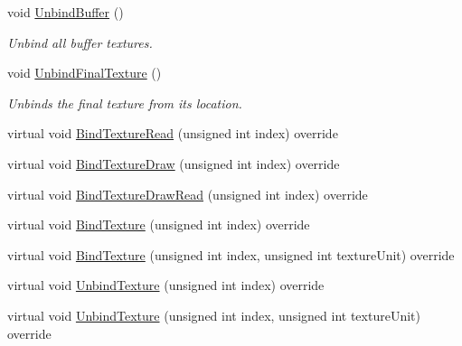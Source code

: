 \begin{DoxyCompactItemize}
\mbox{\label{class_geometry_engine_1_1_geometry_buffer_1_1_g_buffer_a2c24808c13f616bcc3ca6ed321277e95}} 
void \mbox{\hyperlink{class_geometry_engine_1_1_geometry_buffer_1_1_g_buffer_a2c24808c13f616bcc3ca6ed321277e95}{Unbind\+Buffer}} ()
\begin{DoxyCompactList}\small\item\em Unbind all buffer textures. \end{DoxyCompactList}\item 
\mbox{\label{class_geometry_engine_1_1_geometry_buffer_1_1_g_buffer_a954286e665d76dc77f352923a3c0b191}} 
void \mbox{\hyperlink{class_geometry_engine_1_1_geometry_buffer_1_1_g_buffer_a954286e665d76dc77f352923a3c0b191}{Unbind\+Final\+Texture}} ()
\begin{DoxyCompactList}\small\item\em Unbinds the final texture from its location. \end{DoxyCompactList}\item 
virtual void \mbox{\hyperlink{class_geometry_engine_1_1_geometry_buffer_1_1_g_buffer_a40c1b8f341429f061a381ba98574ea82}{Bind\+Texture\+Read}} (unsigned int index) override
\item 
virtual void \mbox{\hyperlink{class_geometry_engine_1_1_geometry_buffer_1_1_g_buffer_ab14f2b1778d7415674b67c3349392cc9}{Bind\+Texture\+Draw}} (unsigned int index) override
\item 
virtual void \mbox{\hyperlink{class_geometry_engine_1_1_geometry_buffer_1_1_g_buffer_a1df706f920cc9a2b15609c6c7e179130}{Bind\+Texture\+Draw\+Read}} (unsigned int index) override
\item 
virtual void \mbox{\hyperlink{class_geometry_engine_1_1_geometry_buffer_1_1_g_buffer_a2c9c631c31f0bda3c9f01c4402819e4b}{Bind\+Texture}} (unsigned int index) override
\item 
virtual void \mbox{\hyperlink{class_geometry_engine_1_1_geometry_buffer_1_1_g_buffer_a9a6d75cdb98cc00e34648f5f423382f1}{Bind\+Texture}} (unsigned int index, unsigned int texture\+Unit) override
\item 
virtual void \mbox{\hyperlink{class_geometry_engine_1_1_geometry_buffer_1_1_g_buffer_a3034ecd5b07b64a0cb7af24f5c6f80ae}{Unbind\+Texture}} (unsigned int index) override
\item 
virtual void \mbox{\hyperlink{class_geometry_engine_1_1_geometry_buffer_1_1_g_buffer_a1f02674c4ff24debb9f4b1b6d1243a9b}{Unbind\+Texture}} (unsigned int index, unsigned int texture\+Unit) override

\end{DoxyCompactItemize}
